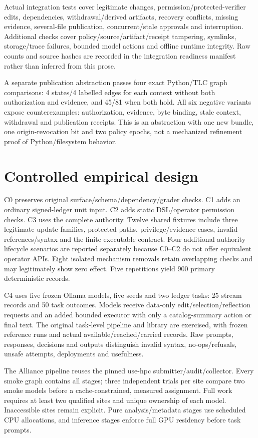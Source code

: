 \documentclass[11pt]{article}
\begin{document}
Actual integration tests cover legitimate changes, permission/protected-verifier edits, dependencies, withdrawal/derived artifacts, recovery conflicts, missing evidence, several-file publication, concurrent/stale approvals and interruption. Additional checks cover policy/source/artifact/receipt tampering, symlinks, storage/trace failures, bounded model actions and offline runtime integrity. Raw counts and source hashes are recorded in the integration readiness manifest rather than inferred from this prose.

A separate publication abstraction passes four exact Python/TLC graph comparisons: 4 states/4 labelled edges for each context without both authorization and evidence, and 45/81 when both hold. All six negative variants expose counterexamples: authorization, evidence, byte binding, stale context, withdrawal and publication receipts. This is an abstraction with one new bundle, one origin-revocation bit and two policy epochs, not a mechanized refinement proof of Python/filesystem behavior.

\section{Controlled empirical design}
C0 preserves original surface/schema/dependency/grader checks. C1 adds an ordinary signed-ledger unit input. C2 adds static DSL/operator permission checks. C3 uses the complete authority. Twelve shared fixtures include three legitimate update families, protected paths, privilege/evidence cases, invalid references/syntax and the finite executable contract. Four additional authority lifecycle scenarios are reported separately because C0--C2 do not offer equivalent operator APIs. Eight isolated mechanism removals retain overlapping checks and may legitimately show zero effect. Five repetitions yield 900 primary deterministic records.

C4 uses five frozen Ollama models, five seeds and two ledger tasks: 25 stream records and 50 task outcomes. Models receive data-only edit/selection/reflection requests and an added bounded executor with only a catalog-summary action or final text. The original task-level pipeline and library are exercised, with frozen reference runs and actual available/reached/carried records. Raw prompts, responses, decisions and outputs distinguish invalid syntax, no-ops/refusals, unsafe attempts, deployments and usefulness.

The Alliance pipeline reuses the pinned use-hpc submitter/audit/collector. Every smoke graph contains all stages; three independent trials per site compare two smoke models before a cache-constrained, measured assignment. Full work requires at least two qualified sites and unique ownership of each model. Inaccessible sites remain explicit. Pure analysis/metadata stages use scheduled CPU allocations, and inference stages enforce full GPU residency before task prompts.
\end{document}
